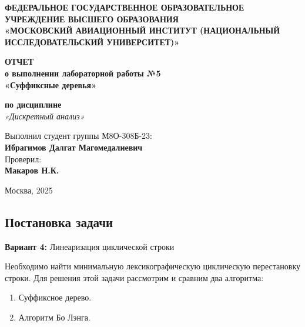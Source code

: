 \documentclass[12pt]{article}
\begin{document}
\begin{titlepage}
    \begin{center}
        \vspace*{1cm}
        
        \textbf{ФЕДЕРАЛЬНОЕ ГОСУДАРСТВЕННОЕ ОБРАЗОВАТЕЛЬНОЕ УЧРЕЖДЕНИЕ ВЫСШЕГО ОБРАЗОВАНИЯ} \\
        \textbf{«МОСКОВСКИЙ АВИАЦИОННЫЙ ИНСТИТУТ (НАЦИОНАЛЬНЫЙ ИССЛЕДОВАТЕЛЬСКИЙ УНИВЕРСИТЕТ)»}
        
        \vspace{3cm}
        
        \textbf{\LARGE ОТЧЕТ} \\
        \vspace{0.5cm}
        \textbf{\Large о выполнении лабораторной работы №5} \\
        \vspace{0.5cm}
        \textbf{\Large «Суффиксные деревья»} \\
        \vspace{1cm}
        
        \textbf{по дисциплине} \\
        \textit{«Дискретный анализ»}
        
        \vfill
        
        \begin{flushleft}
        Выполнил студент группы М8О-308Б-23: \\
        \textbf{Ибрагимов Далгат Магомедалиевич} \\
        \vspace{0.5cm}
        Проверил: \\
        \textbf{Макаров Н.К.}
        \end{flushleft}
        
        \vspace{3cm}
        
        Москва, 2025
    \end{center}
\end{titlepage}

\subsection*{Постановка задачи}

\textbf{Вариант 4:} Линеаризация циклической строки

\text Необходимо найти минимальную лексикографическую циклическую перестановку строки. Для решения этой задачи рассмотрим и сравним два алгоритма:
\begin{enumerate}
    \item Суффиксное дерево.
    \item Алгоритм Бо Лэнга.
\end{enumerate}
\end{document}
